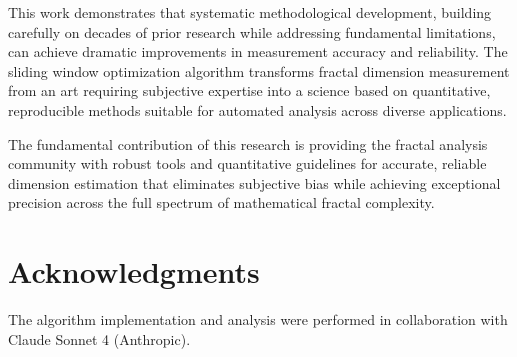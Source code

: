 \documentclass[preprint,12pt]{elsarticle}
\begin{document}
This work demonstrates that systematic methodological development, building carefully on decades of prior research while addressing fundamental limitations, can achieve dramatic improvements in measurement accuracy and reliability. The sliding window optimization algorithm transforms fractal dimension measurement from an art requiring subjective expertise into a science based on quantitative, reproducible methods suitable for automated analysis across diverse applications.

The fundamental contribution of this research is providing the fractal analysis community with robust tools and quantitative guidelines for accurate, reliable dimension estimation that eliminates subjective bias while achieving exceptional precision across the full spectrum of mathematical fractal complexity.

\section*{Acknowledgments}
The algorithm implementation and analysis were performed in collaboration with Claude Sonnet 4 (Anthropic).

\appendix


\end{document}
